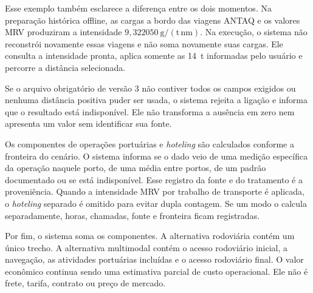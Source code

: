 
Esse exemplo também esclarece a diferença entre os dois momentos. Na preparação histórica offline, as cargas a bordo das viagens ANTAQ e os valores MRV produziram a intensidade \(9{,}322050~\mathrm{g/(t\,nm)}\). Na execução, o sistema não reconstrói novamente essas viagens e não soma novamente suas cargas. Ele consulta a intensidade pronta, aplica somente as 14~t informadas pelo usuário e percorre a distância selecionada.

Se o arquivo obrigatório de versão 3 não contiver todos os campos exigidos ou nenhuma distância positiva puder ser usada, o sistema rejeita a ligação e informa que o resultado está indisponível. Ele não transforma a ausência em zero nem apresenta um valor sem identificar sua fonte.

Os componentes de operações portuárias e \emph{hoteling} são calculados conforme a fronteira do cenário. O sistema informa se o dado veio de uma medição específica da operação naquele porto, de uma média entre portos, de um padrão documentado ou se está indisponível. Esse registro da fonte e do tratamento é a proveniência. Quando a intensidade MRV por trabalho de transporte é aplicada, o \emph{hoteling} separado é omitido para evitar dupla contagem. Se um modo o calcula separadamente, horas, chamadas, fonte e fronteira ficam registradas.

Por fim, o sistema soma os componentes. A alternativa rodoviária contém um único trecho. A alternativa multimodal contém o acesso rodoviário inicial, a navegação, as atividades portuárias incluídas e o acesso rodoviário final. O valor econômico continua sendo uma estimativa parcial de custo operacional. Ele não é frete, tarifa, contrato ou preço de mercado.

